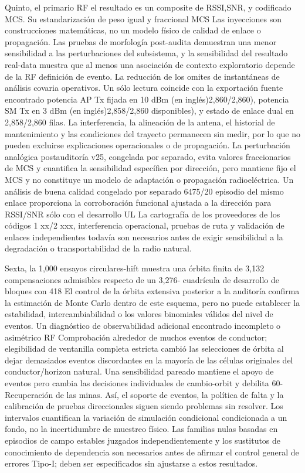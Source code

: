 \documentclass{ieeeaccess}
\begin{document}
Quinto, el primario RF el resultado es un composite de RSSI,SNR, y codificado MCS. Su estandarización de peso igual y fraccional MCS Las inyecciones son construcciones matemáticas, no un modelo físico de calidad de enlace o propagación. Las pruebas de morfología post-audita demuestran una menor sensibilidad a las perturbaciones del subsistema, y la sensibilidad del resultado real-data muestra que al menos una asociación de contexto exploratorio depende de la RF definición de evento. La reducción de los omites de instantáneas de análisis covaria operativos. Un sólo lectura coincide con la exportación fuente encontrado potencia AP Tx fijada en 10 dBm (en inglés)2,860/2,860), potencia SM Tx en 3 dBm (en inglés)2,858/2,860 disponibles), y estado de enlace dual en 2,858/2,860 filas. La interferencia, la alineación de la antena, el historial de mantenimiento y las condiciones del trayecto permanecen sin medir, por lo que no pueden excluirse explicaciones operacionales o de propagación. La perturbación analógica postauditoría v25, congelada por separado, evita valores fraccionarios de MCS y cuantifica la sensibilidad específica por dirección, pero mantiene fijo el MCS y no constituye un modelo de adaptación o propagación radioeléctrica. Un análisis de buena calidad congelado por separado 6475/20 episodio del mismo enlace proporciona la corroboración funcional ajustada a la dirección para RSSI/SNR sólo con el desarrollo UL La cartografía de los proveedores de los códigos 1 xx/2 xxx, interferencia operacional, pruebas de ruta y validación de enlaces independientes todavía son necesarios antes de exigir sensibilidad a la degradación o transportabilidad de la radio natural.

Sexta, la 1,000 ensayos circulares-hift muestra una órbita finita de 3,132 compensaciones admisibles respecto de un 3,276- cuadrícula de desarrollo de bloques con 418 El control de la órbita extensiva posterior a la auditoría confirma la estimación de Monte Carlo dentro de este esquema, pero no puede establecer la estabilidad, intercambiabilidad o los valores binomiales válidos del nivel de eventos. Un diagnóstico de observabilidad adicional encontrado incompleto o asimétrico RF Comprobación alrededor de muchos eventos de conductor; elegibilidad de ventanilla completa estricta cambió las selecciones de órbita al dejar demasiados eventos discordantes en la mayoría de las células originales del conductor/horizon natural. Una sensibilidad pareado mantiene el apoyo de eventos pero cambia las decisiones individuales de cambio-orbit y debilita 60-Recuperación de las minas. Así, el soporte de eventos, la política de falta y la calibración de pruebas direccionales siguen siendo problemas sin resolver. Los intervalos cuantifican la variación de simulación condicional condicionada a un fondo, no la incertidumbre de muestreo físico. Las familias nulas basadas en episodios de campo estables juzgados independientemente y los sustitutos de conocimiento de dependencia son necesarios antes de afirmar el control general de errores Tipo-I; deben ser especificados sin ajustarse a estos resultados.
\end{document}
